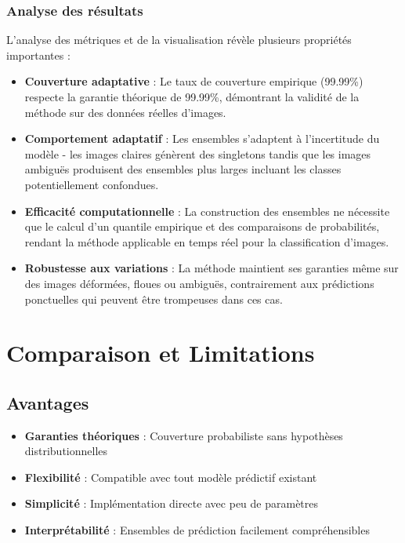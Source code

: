 \documentclass[a4paper,12pt]{article}
\begin{document}
\subsubsection{Analyse des résultats}

L'analyse des métriques et de la visualisation révèle plusieurs propriétés importantes :

\begin{itemize}
\item \textbf{Couverture adaptative} : Le taux de couverture empirique (99.99\%) respecte la garantie théorique de 99.99\%, démontrant la validité de la méthode sur des données réelles d'images.

\item \textbf{Comportement adaptatif} : Les ensembles s'adaptent à l'incertitude du modèle - les images claires génèrent des singletons tandis que les images ambiguës produisent des ensembles plus larges incluant les classes potentiellement confondues.

\item \textbf{Efficacité computationnelle} : La construction des ensembles ne nécessite que le calcul d'un quantile empirique et des comparaisons de probabilités, rendant la méthode applicable en temps réel pour la classification d'images.

\item \textbf{Robustesse aux variations} : La méthode maintient ses garanties même sur des images déformées, floues ou ambiguës, contrairement aux prédictions ponctuelles qui peuvent être trompeuses dans ces cas.
\end{itemize}

\section{Comparaison et Limitations}

\subsection{Avantages}

\begin{itemize}
\item \textbf{Garanties théoriques} : Couverture probabiliste sans hypothèses distributionnelles
\item \textbf{Flexibilité} : Compatible avec tout modèle prédictif existant
\item \textbf{Simplicité} : Implémentation directe avec peu de paramètres
\item \textbf{Interprétabilité} : Ensembles de prédiction facilement compréhensibles
\end{itemize}
\end{document}
